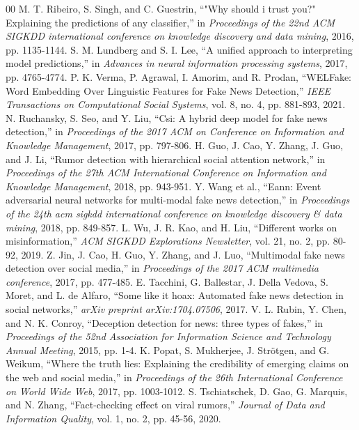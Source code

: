 \documentclass[conference]{IEEEtran}
\begin{document}
\begin{thebibliography}{00}
 M. T. Ribeiro, S. Singh, and C. Guestrin, ``"Why should i trust you?" Explaining the predictions of any classifier,'' in \textit{Proceedings of the 22nd ACM SIGKDD international conference on knowledge discovery and data mining}, 2016, pp. 1135-1144.
 S. M. Lundberg and S. I. Lee, ``A unified approach to interpreting model predictions,'' in \textit{Advances in neural information processing systems}, 2017, pp. 4765-4774.
 P. K. Verma, P. Agrawal, I. Amorim, and R. Prodan, ``WELFake: Word Embedding Over Linguistic Features for Fake News Detection,'' \textit{IEEE Transactions on Computational Social Systems}, vol. 8, no. 4, pp. 881-893, 2021.
 N. Ruchansky, S. Seo, and Y. Liu, ``Csi: A hybrid deep model for fake news detection,'' in \textit{Proceedings of the 2017 ACM on Conference on Information and Knowledge Management}, 2017, pp. 797-806.
 H. Guo, J. Cao, Y. Zhang, J. Guo, and J. Li, ``Rumor detection with hierarchical social attention network,'' in \textit{Proceedings of the 27th ACM International Conference on Information and Knowledge Management}, 2018, pp. 943-951.
 Y. Wang et al., ``Eann: Event adversarial neural networks for multi-modal fake news detection,'' in \textit{Proceedings of the 24th acm sigkdd international conference on knowledge discovery \& data mining}, 2018, pp. 849-857.
 L. Wu, J. R. Kao, and H. Liu, ``Different works on misinformation,'' \textit{ACM SIGKDD Explorations Newsletter}, vol. 21, no. 2, pp. 80-92, 2019.
 Z. Jin, J. Cao, H. Guo, Y. Zhang, and J. Luo, ``Multimodal fake news detection over social media,'' in \textit{Proceedings of the 2017 ACM multimedia conference}, 2017, pp. 477-485.
 E. Tacchini, G. Ballestar, J. Della Vedova, S. Moret, and L. de Alfaro, ``Some like it hoax: Automated fake news detection in social networks,'' \textit{arXiv preprint arXiv:1704.07506}, 2017.
 V. L. Rubin, Y. Chen, and N. K. Conroy, ``Deception detection for news: three types of fakes,'' in \textit{Proceedings of the 52nd Association for Information Science and Technology Annual Meeting}, 2015, pp. 1-4.
 K. Popat, S. Mukherjee, J. Strötgen, and G. Weikum, ``Where the truth lies: Explaining the credibility of emerging claims on the web and social media,'' in \textit{Proceedings of the 26th International Conference on World Wide Web}, 2017, pp. 1003-1012.
 S. Tschiatschek, D. Gao, G. Marquis, and N. Zhang, ``Fact-checking effect on viral rumors,'' \textit{Journal of Data and Information Quality}, vol. 1, no. 2, pp. 45-56, 2020.
\end{thebibliography}
\end{document}
